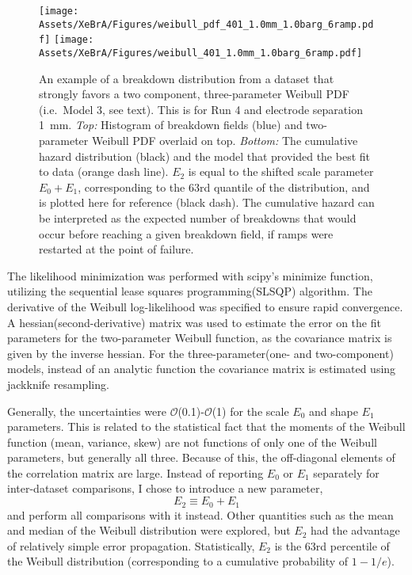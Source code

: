 \begin{figure}
\centering
    \texttt{[image: Assets/XeBrA/Figures/weibull\_pdf\_401\_1.0mm\_1.0barg\_6ramp.pdf]}
    \qquad
    \centering
    \texttt{[image: Assets/XeBrA/Figures/weibull\_401\_1.0mm\_1.0barg\_6ramp.pdf]}
 \caption[An example of a breakdown distribution from a dataset that strongly favors a two component, three-parameter Weibull PDF ]%
 {An example of a breakdown distribution from a dataset that strongly favors a two component, three-parameter Weibull PDF (i.e.~Model 3, see text). 
 This is for Run 4 and electrode separation 1~mm. \emph{Top:} Histogram of breakdown fields (blue) and two-parameter Weibull PDF overlaid on top. \emph{Bottom:} The cumulative hazard distribution (black) and the model that provided the best fit to data (orange dash line). $E_2$ is equal to the shifted scale parameter $E_0+E_1$, corresponding to the 63rd quantile of the distribution, and is plotted here for reference (black dash). The cumulative hazard can be interpreted as the expected number of breakdowns that would occur before reaching a given breakdown field, if ramps were restarted at the point of failure.
 }
    \label{fig:weibull_2comp}
\end{figure}

The likelihood minimization was performed with scipy's $\text{minimize}$ function, utilizing the sequential lease squares programming(SLSQP) algorithm.
The derivative of the Weibull log-likelihood was specified to ensure rapid convergence.
A hessian(second-derivative) matrix was used to estimate the error on the fit parameters for the two-parameter Weibull function, as the covariance matrix is given by the inverse hessian.
For the three-parameter(one- and two-component) models, instead of an analytic function the covariance matrix is estimated using jackknife resampling\cite{nisbet_chapter_2018}.

Generally, the uncertainties were $\mathcal{O}$(0.1)-$\mathcal{O}$(1) for the scale $E_0$ and shape $E_1$ parameters.
This is related to the statistical fact that the moments of the Weibull function (mean, variance, skew) are not functions of only one of the Weibull parameters, but generally all three.
Because of this, the off-diagonal elements of the correlation matrix are large.
Instead of reporting $E_0$ or $E_1$ separately for inter-dataset comparisons, I chose to introduce a new parameter,
\begin{equation}
E_2 \equiv E_0+E_1    
\end{equation}
\noindent
and perform all comparisons with it instead.
Other quantities such as the mean and median of the Weibull distribution were explored, but $E_2$ had the advantage of relatively simple error propagation.
Statistically, $E_2$ is the 63rd percentile of the Weibull distribution (corresponding to a cumulative probability of  $1-1/e$).



